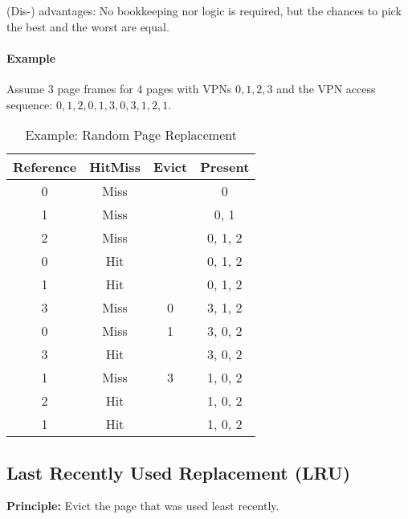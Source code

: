 			(Dis-) advantages: No bookkeeping nor logic is required, but the chances to pick the best and the worst are equal.

			\paragraph{Example}
				Assume 3 page frames for 4 pages with VPNs \( 0, 1, 2, 3 \) and the VPN access sequence: \( 0, 1, 2, 0, 1, 3, 0, 3, 1, 2, 1 \).
				\begin{table}[H]
					\centering
					\begin{tabular}{c|c|c|c}
						\textbf{Reference} & \textbf{Hit}\textbf{Miss} & \textbf{Evict} & \textbf{Present} \\ \hline
						0                  & Miss                      &                & 0                \\
						1                  & Miss                      &                & 0, 1             \\
						2                  & Miss                      &                & 0, 1, 2          \\
						0                  & Hit                       &                & 0, 1, 2          \\
						1                  & Hit                       &                & 0, 1, 2          \\
						3                  & Miss                      & 0              & 3, 1, 2          \\
						0                  & Miss                      & 1              & 3, 0, 2          \\
						3                  & Hit                       &                & 3, 0, 2          \\
						1                  & Miss                      & 3              & 1, 0, 2          \\
						2                  & Hit                       &                & 1, 0, 2          \\
						1                  & Hit                       &                & 1, 0, 2
					\end{tabular}
					\caption{Example: Random Page Replacement}
				\end{table}

		\subsection{Last Recently Used Replacement (LRU)}
			\textbf{Principle:} Evict the page that was used least recently.

